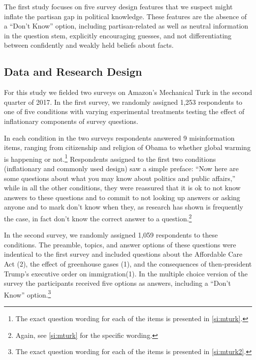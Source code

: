 \documentclass[12pt, letterpaper]{article}
\begin{document}
The first study focuses on five survey design features that we suspect might inflate the partisan gap in political knowledge. These features are the absence of a ``Don't Know'' option, including partisan-related as well as neutral information in the question stem, explicitly encouraging guesses, and not differentiating between confidently and weakly held beliefs about facts.

\subsection*{Data and Research Design}\label{sec:data}

For this study we fielded two surveys on Amazon's Mechanical Turk \citep{BerinskyHuberLenz2012} in the second quarter of 2017. In the first survey, we randomly assigned 1,253 respondents to one of five conditions with varying experimental treatments testing the effect of inflationary components of survey questions.

In each condition in the two surveys respondents answered 9 misinformation items, ranging from citizenship and religion of Obama to whether global warming is happening or not.\footnote{The exact question wording for each of the items is presented in \cref{si:mturk}.} Respondents assigned to the first two conditions (inflationary and commonly used design) saw a simple preface: ``Now here are some questions about what you may know about politics and public affairs,'' while in all the other conditions, they were reassured that it is ok to not know answers to these questions and to commit to not looking up answers or asking anyone and to mark don't know when they, as research has shown is frequently the case, in fact don’t know the correct answer to a question.\footnote{Again, see \cref{si:mturk} for the specific wording.}

In the second survey, we randomly assigned 1,059 respondents to these conditions. The preamble, topics, and answer options of these questions were indentical to the first survey and included questions about the Affordable Care Act (2), the effect of greenhouse gases (1), and the consequences of then-president Trump's executive order on immigration(1). In the multiple choice version of the survey the participants received five options as answers, including a ``Don't Know'' option.\footnote{The exact question wording for each of the items is presented in \cref{si:mturk2}.}
\end{document}
